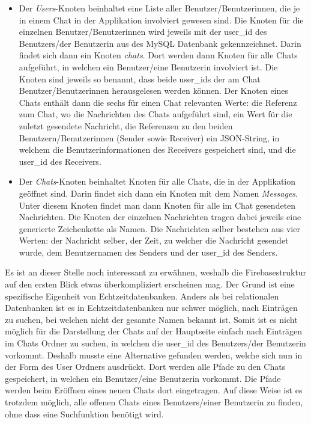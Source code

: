 \documentclass[../main.tex]{subfiles}
\begin{document}
	\begin{itemize}
		\item Der \emph{Users}-Knoten beinhaltet eine Liste aller Benutzer/Benutzerinnen, die je in einem Chat in der Applikation involviert gewesen sind. Die Knoten für die einzelnen Benutzer/Benutzerinnen wird jeweils mit der user\_id des Benutzers/der Benutzerin aus des MySQL Datenbank gekennzeichnet. Darin findet sich dann ein Knoten \emph{chats}. Dort werden dann Knoten für alle Chats aufgeführt, in welchen ein Benutzer/eine Benutzerin involviert ist. Die Knoten sind jeweils so benannt, dass beide user\_ids der am Chat Benutzer/Benutzerinnen herausgelesen werden können. Der Knoten eines Chats enthält dann die sechs für einen Chat relevanten Werte: die Referenz zum Chat, wo die Nachrichten des Chats aufgeführt sind, ein Wert für die zuletzt gesendete Nachricht, die Referenzen zu den beiden Benutzern/Benutzerinnen (Sender sowie Receiver) ein JSON-String, in welchem die Benutzerinformationen des Receivers gespeichert sind, und die user\_id des Receivers.
		\item  Der \emph{Chats}-Knoten beinhaltet Knoten für alle Chats, die in der Applikation geöffnet sind. Darin findet sich dann ein Knoten mit dem Namen \emph{Messages}. Unter diesem Knoten findet man dann Knoten für alle im Chat gesendeten Nachrichten. Die Knoten der einzelnen Nachrichten tragen dabei jeweils eine generierte Zeichenkette als Namen. Die Nachrichten selber bestehen aus vier Werten: der Nachricht selber, der Zeit, zu welcher die Nachricht gesendet wurde, dem Benutzernamen des Senders und der user\_id des Senders.
	\end{itemize}

	Es ist an dieser Stelle noch interessant zu erwähnen, weshalb die Firebasestruktur auf den ersten Blick etwas überkompliziert erscheinen mag. Der Grund ist eine spezifische Eigenheit von Echtzeitdatenbanken. Anders als bei relationalen Datenbanken ist es in Echtzeitdatenbanken nur schwer möglich, nach Einträgen zu suchen, bei welchen nicht der gesamte Namen bekannt ist. Somit ist es nicht möglich für die Darstellung der Chats auf der Hauptseite einfach nach Einträgen im Chats Ordner zu suchen, in welchen die user\_id des Benutzers/der Benutzerin vorkommt. Deshalb musste eine Alternative gefunden werden, welche sich nun in der Form des User Ordners ausdrückt. Dort werden alle Pfade zu den Chats gespeichert, in welchen ein Benutzer/eine Benutzerin vorkommt. Die Pfade werden beim Eröffnen eines neuen Chats dort eingetragen. Auf diese Weise ist es trotzdem möglich, alle offenen Chats eines Benutzers/einer Benutzerin zu finden, ohne dass eine Suchfunktion benötigt wird.
	
\end{document}
